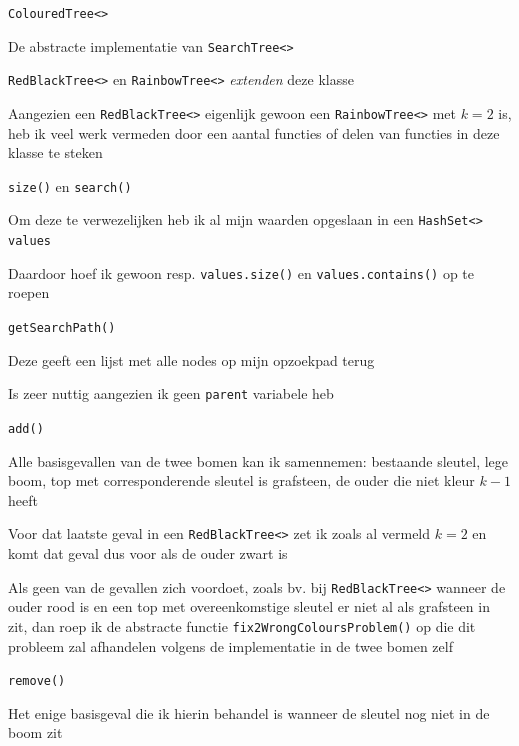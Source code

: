 \documentclass{article}
\def\code#1{\texttt{#1}}
\begin{document}
\vspace{0.5cm}

\Large \code{ColouredTree<>}

\vspace{0.3cm}

\large

De abstracte implementatie van \code{SearchTree<>}

\code{RedBlackTree<>} en \code{RainbowTree<>} \textit{extenden} deze klasse

Aangezien een \code{RedBlackTree<>} eigenlijk gewoon een \code{RainbowTree<>} met $k = 2$ is, heb ik veel werk vermeden door een aantal functies of delen van functies in deze klasse te steken

\vspace{0.2cm}

\code{size()} en \code{search()}

Om deze te verwezelijken heb ik al mijn waarden opgeslaan in een \code{HashSet<> values}

Daardoor hoef ik gewoon resp. \code{values.size()} en \code{values.contains()} op te roepen

\vspace{0.2cm}

\code{getSearchPath()}

Deze geeft een lijst met alle nodes op mijn opzoekpad terug

Is zeer nuttig aangezien ik geen \code{parent} variabele heb

\vspace{0.2cm}

\code{add()}

Alle basisgevallen van de twee bomen kan ik samennemen: bestaande sleutel, lege boom, top met corresponderende sleutel is grafsteen, de ouder die niet kleur $k - 1$ heeft

Voor dat laatste geval in een \code{RedBlackTree<>} zet ik zoals al vermeld $k = 2$ en komt dat geval dus voor als de ouder zwart is

Als geen van de gevallen zich voordoet, zoals bv. bij \code{RedBlackTree<>} wanneer de ouder rood is en een top met overeenkomstige sleutel er niet al als grafsteen in zit, dan roep ik de abstracte functie \code{fix2WrongColoursProblem()} op die dit probleem zal afhandelen volgens de implementatie in de twee bomen zelf

\vspace{0.2cm}

\code{remove()}

Het enige basisgeval die ik hierin behandel is wanneer de sleutel nog niet in de boom zit
\end{document}
